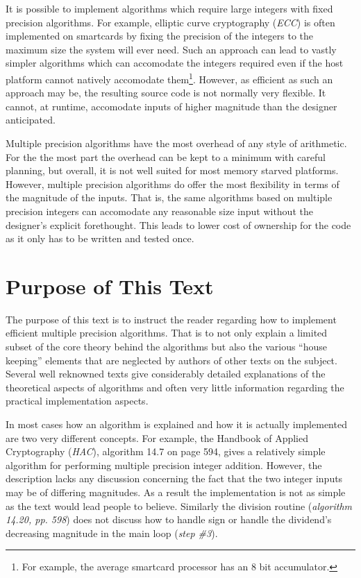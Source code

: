 \documentclass[b5paper]{book}
\begin{document}
It is possible to implement algorithms which require large integers with fixed precision algorithms.  For example, elliptic
curve cryptography (\textit{ECC}) is often implemented on smartcards by fixing the precision of the integers to the maximum 
size the system will ever need.  Such an approach can lead to vastly simpler algorithms which can accomodate the 
integers required even if the host platform cannot natively accomodate them\footnote{For example, the average smartcard 
processor has an 8 bit accumulator.}.  However, as efficient as such an approach may be, the resulting source code is not
normally very flexible.  It cannot, at runtime, accomodate inputs of higher magnitude than the designer anticipated.

Multiple precision algorithms have the most overhead of any style of arithmetic.  For the the most part the 
overhead can be kept to a minimum with careful planning, but overall, it is not well suited for most memory starved
platforms.  However, multiple precision algorithms do offer the most flexibility in terms of the magnitude of the 
inputs.  That is, the same algorithms based on multiple precision integers can accomodate any reasonable size input 
without the designer's explicit forethought.  This leads to lower cost of ownership for the code as it only has to 
be written and tested once.

\section{Purpose of This Text}
The purpose of this text is to instruct the reader regarding how to implement efficient multiple precision algorithms.  
That is to not only explain a limited subset of the core theory behind the algorithms but also the various ``house keeping'' 
elements that are neglected by authors of other texts on the subject.  Several well reknowned texts \cite{TAOCPV2,HAC} 
give considerably detailed explanations of the theoretical aspects of algorithms and often very little information 
regarding the practical implementation aspects.  

In most cases how an algorithm is explained and how it is actually implemented are two very different concepts.  For 
example, the Handbook of Applied Cryptography (\textit{HAC}), algorithm 14.7 on page 594, gives a relatively simple 
algorithm for performing multiple precision integer addition.  However, the description lacks any discussion concerning 
the fact that the two integer inputs may be of differing magnitudes.  As a result the implementation is not as simple
as the text would lead people to believe.  Similarly the division routine (\textit{algorithm 14.20, pp. 598}) does not 
discuss how to handle sign or handle the dividend's decreasing magnitude in the main loop (\textit{step \#3}).
\end{document}
